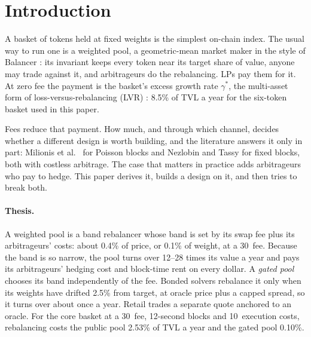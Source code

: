 \section{Introduction}

A basket of tokens held at fixed weights is the simplest on-chain index. The usual way to run one is a weighted pool, a geometric-mean market maker in the style of Balancer \cite{evans}: its invariant keeps every token near its target share of value, anyone may trade against it, and arbitrageurs do the rebalancing. LPs pay them for it. At zero fee the payment is the basket's excess growth rate $\gamma^{*}$, the multi-asset form of loss-versus-rebalancing (LVR) \cite{lvr}: 8.5\% of TVL a year for the six-token basket used in this paper.

Fees reduce that payment. How much, and through which channel, decides whether a different design is worth building, and the literature answers it only in part: Milionis et al.\ \cite{lvrfees} for Poisson blocks and Nezlobin and Tassy \cite{nt} for fixed blocks, both with costless arbitrage. The case that matters in practice adds arbitrageurs who pay to hedge. This paper derives it, builds a design on it, and then tries to break both.

\paragraph{Thesis.} A weighted pool is a band rebalancer whose band is set by its swap fee plus its arbitrageurs' costs: about 0.4\% of price, or 0.1\% of weight, at a 30\bps\ fee. Because the band is so narrow, the pool turns over 12--28 times its value a year and pays its arbitrageurs' hedging cost and block-time rent on every dollar. A \emph{gated pool} chooses its band independently of the fee. Bonded solvers rebalance it only when its weights have drifted 2.5\% from target, at oracle price plus a capped spread, so it turns over about once a year. Retail trades a separate quote anchored to an oracle. For the core basket at a 30\bps\ fee, 12-second blocks and 10\bps\ execution costs, rebalancing costs the public pool 2.53\% of TVL a year and the gated pool 0.10\%.


